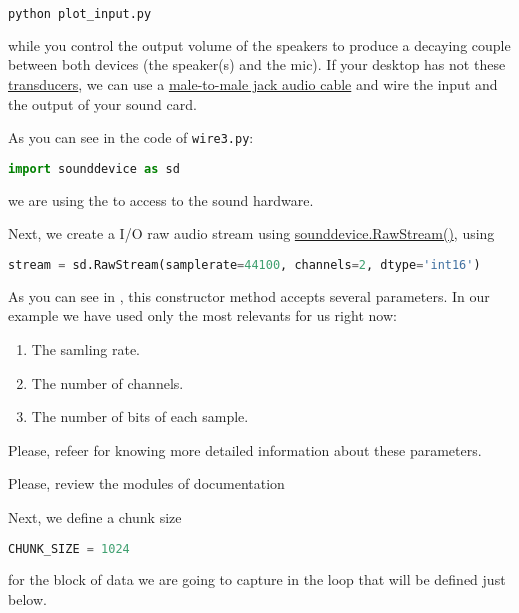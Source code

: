 \begin{enumerate}
\begin{enumerate}
    \begin{lstlisting}[language=Bash]
      python plot_input.py
    \end{lstlisting}

    while you control the output volume of the speakers to produce a
    decaying couple between both devices (the speaker(s) and the
    mic). If your desktop has not these
    \href{https://en.wikipedia.org/wiki/Transducer}{transducers}, we
    can use a
    \href{https://www.google.com/search?q=male+to+male+audio+jack+cable&client=firefox-b-d&sxsrf=ALeKk00GZUDGqiOfc0D8xkA_MIYgCuZmSA:1600270049146&source=lnms&tbm=isch&sa=X&ved=2ahUKEwjdvsu-_u3rAhXl0eAKHS90DUoQ_AUoAXoECA0QAw&biw=4288&bih=972}{male-to-male
      jack audio cable} and wire the input and the output of your
    sound card.

    
As you can see in the code of \texttt{wire3.py}:

\begin{lstlisting}[language=Python]
import sounddevice as sd
\end{lstlisting}

we are using the
 to access to the sound hardware.

Next, we create a I/O raw audio stream
using \href{https://python-sounddevice.readthedocs.io/en/latest/api/raw-streams.html#sounddevice.RawStream}{sounddevice.RawStream()},
using
\begin{lstlisting}[language=Python]
stream = sd.RawStream(samplerate=44100, channels=2, dtype='int16')
\end{lstlisting}

As you can see in \cite{sounddevice}, this constructor method accepts
several parameters. In our example we have used only the most
relevants for us right now:
\begin{enumerate}
\item The samling rate.
\item The number of channels.
\item The number of bits of each sample.
\end{enumerate}
Please, refeer \cite{harmonic-analysis} for knowing more detailed
information about these parameters.

Please, review the modules of documentation 

Next, we define a chunk size
\begin{lstlisting}[language=Python]
CHUNK_SIZE = 1024
\end{lstlisting}
for the block of data we are going to capture in the loop that will
be defined just below.


\end{enumerate}
\end{enumerate}
